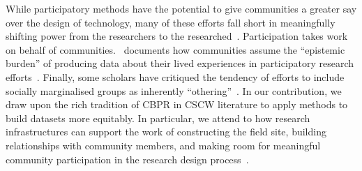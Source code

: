 While participatory methods have the potential to give communities a greater say over the design of technology, many of these efforts fall short in meaningfully shifting power from the researchers to the researched~\cite{birhane2021misogyny,ojewaleAIAccountabilityInfrastructure2024,ParticipationScaleTensions}.  Participation takes work on behalf of communities.~\citet{pierre2021getting} documents how communities assume the ``epistemic burden'' of producing data about their lived experiences in participatory research efforts~\cite{pierre2021getting}. Finally, some scholars have critiqued the tendency of efforts to include socially marginalised groups as inherently ``othering''~\cite{epstein2008rise}. In our contribution, we draw upon the rich tradition of CBPR in CSCW literature to apply methods to build datasets more equitably. In particular, we attend to how research infrastructures can support the work of constructing the field site, building relationships with community members, and making room for meaningful community participation in the research design process~\cite{le2015strangers}. 
